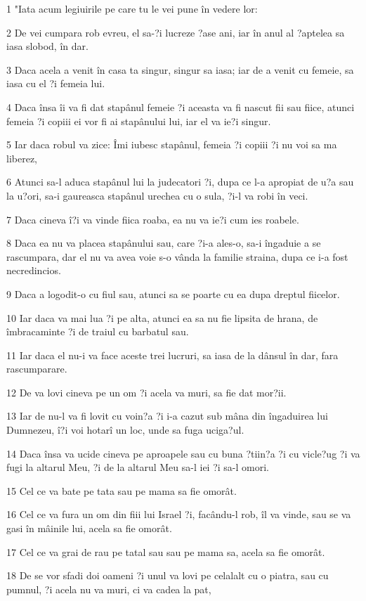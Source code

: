 \par 1 "Iata acum legiuirile pe care tu le vei pune în vedere lor:
\par 2 De vei cumpara rob evreu, el sa-?i lucreze ?ase ani, iar în anul al ?aptelea sa iasa slobod, în dar.
\par 3 Daca acela a venit în casa ta singur, singur sa iasa; iar de a venit cu femeie, sa iasa cu el ?i femeia lui.
\par 4 Daca însa îi va fi dat stapânul femeie ?i aceasta va fi nascut fii sau fiice, atunci femeia ?i copiii ei vor fi ai stapânului lui, iar el va ie?i singur.
\par 5 Iar daca robul va zice: Îmi iubesc stapânul, femeia ?i copiii ?i nu voi sa ma liberez,
\par 6 Atunci sa-l aduca stapânul lui la judecatori ?i, dupa ce l-a apropiat de u?a sau la u?ori, sa-i gaureasca stapânul urechea cu o sula, ?i-l va robi în veci.
\par 7 Daca cineva î?i va vinde fiica roaba, ea nu va ie?i cum ies roabele.
\par 8 Daca ea nu va placea stapânului sau, care ?i-a ales-o, sa-i îngaduie a se rascumpara, dar el nu va avea voie s-o vânda la familie straina, dupa ce i-a fost necredincios.
\par 9 Daca a logodit-o cu fiul sau, atunci sa se poarte cu ea dupa dreptul fiicelor.
\par 10 Iar daca va mai lua ?i pe alta, atunci ea sa nu fie lipsita de hrana, de îmbracaminte ?i de traiul cu barbatul sau.
\par 11 Iar daca el nu-i va face aceste trei lucruri, sa iasa de la dânsul în dar, fara rascumparare.
\par 12 De va lovi cineva pe un om ?i acela va muri, sa fie dat mor?ii.
\par 13 Iar de nu-l va fi lovit cu voin?a ?i i-a cazut sub mâna din îngaduirea lui Dumnezeu, î?i voi hotarî un loc, unde sa fuga uciga?ul.
\par 14 Daca însa va ucide cineva pe aproapele sau cu buna ?tiin?a ?i cu vicle?ug ?i va fugi la altarul Meu, ?i de la altarul Meu sa-l iei ?i sa-l omori.
\par 15 Cel ce va bate pe tata sau pe mama sa fie omorât.
\par 16 Cel ce va fura un om din fiii lui Israel ?i, facându-l rob, îl va vinde, sau se va gasi în mâinile lui, acela sa fie omorât.
\par 17 Cel ce va grai de rau pe tatal sau sau pe mama sa, acela sa fie omorât.
\par 18 De se vor sfadi doi oameni ?i unul va lovi pe celalalt cu o piatra, sau cu pumnul, ?i acela nu va muri, ci va cadea la pat,
